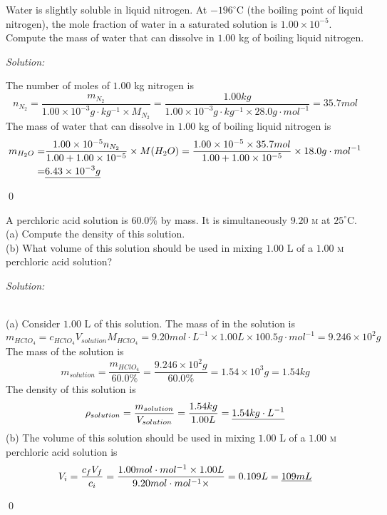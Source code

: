 \documentclass[12pt]{article}
\newenvironment{problem}[2][Problem]{\begin{trivlist}
\item[\hskip \labelsep {\bfseries #1}\hskip \labelsep {\bfseries #2.}]}{\end{trivlist}}
\newenvironment{sol}
    {\emph{Solution:}
    }
    {
    \qed
    }
\begin{document}
\begin{problem}{11.7}
Water is slightly soluble in liquid nitrogen. At $-196 ^\circ$C (the boiling point of liquid nitrogen), the mole fraction of water in a saturated solution is $1.00\times10^{-5}$. Compute the mass of water that can dissolve in $1.00$ kg of boiling liquid nitrogen.
\end{problem}
\begin{sol}
The number of moles of $1.00$ kg nitrogen is
\[
n_{N_2}=\frac{m_{N_2}}{1.00\times10^{-3}g\cdot kg^{-1}\times M_{N_2}}=\frac{1.00kg}{1.00\times10^{-3}g\cdot kg^{-1}\times28.0g\cdot{mol}^{-1}}=35.7mol
\]
The mass of water that can dissolve in $1.00$ kg of boiling liquid nitrogen is
\begin{align*}
m_{H_2O}=&\frac{1.00\times10^{-5}n_{N_2}}{1.00+1.00\times10^{-5}}\times M(H_2O)=\frac{1.00\times10^{-5}\times35.7mol}{1.00+1.00\times10^{-5}}\times18.0g\cdot mol^{-1}\\
=&\uline{6.43\times10^{-3}g}
\end{align*}
\end{sol}

\begin{problem}{11.10}
A perchloric acid solution is $60.0\%$  by mass. It is
simultaneously $9.20$ \textsc{m} at $25 ^\circ$C.\\
(a) Compute the density of this solution.\\
(b) What volume of this solution should be used in mixing $1.00$ L of a $1.00$ \textsc{m} perchloric acid solution?
\end{problem}
\begin{sol}
\\(a) Consider $1.00$ L of this solution. The mass of  in the solution is
\[
m_{HClO_4}=c_{HClO_4}V_{solution}M_{HClO_4}=9.20mol\cdot L^{-1}\times1.00L\times100.5g\cdot mol^{-1}=9.246\times10^{2}g
\]
The mass of the solution is
\[
m_{solution}=\frac{m_{HClO_4}}{60.0\%}=\frac{9.246\times10^{2}g}{60.0\%}=1.54\times10^{3}g=1.54kg
\]
The density of this solution is
\[
\rho_{solution}=\frac{m_{solution}}{V_{solution}}=\frac{1.54kg}{1.00L}=\uline{1.54kg\cdot L^{-1}}
\]
(b) The volume of this solution should be used in mixing $1.00$ L of a $1.00$ \textsc{m} perchloric acid solution is
\[
V_i=\frac{c_fV_f}{c_i}=\frac{1.00mol\cdot mol^{-1}\times1.00L}{9.20mol\cdot mol^{-1}\times}=0.109L=\uline{109mL}
\]
\end{sol}
\end{document}
